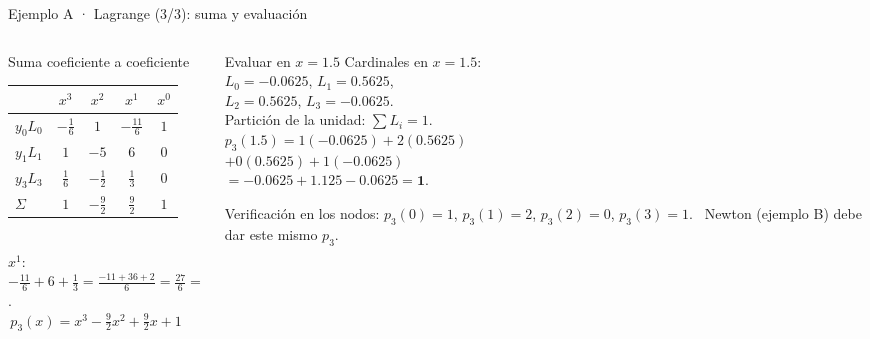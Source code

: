 \documentclass[aspectratio=169,10pt]{beamer}
\begin{document}
\begin{frame}{Ejemplo A · Lagrange (3/3): suma y evaluación}
\begin{columns}[T]
\begin{column}{0.52\textwidth}
\begin{cardgear}{Suma coeficiente a coeficiente}{\faTable}
\centering
{\footnotesize\renewcommand{\arraystretch}{1.2}\setlength{\tabcolsep}{6pt}
\begin{tabular}{l|cccc}
 & $x^3$ & $x^2$ & $x^1$ & $x^0$\\\hline
$y_0L_0$ & $-\tfrac16$ & $1$ & $-\tfrac{11}{6}$ & $1$\\
$y_1L_1$ & $1$ & $-5$ & $6$ & $0$\\
$y_3L_3$ & $\tfrac16$ & $-\tfrac12$ & $\tfrac13$ & $0$\\\hline
$\Sigma$ & $1$ & $-\tfrac92$ & $\tfrac92$ & $1$\\
\end{tabular}}\\[1.2mm]
{\footnotesize $x^1$: $-\tfrac{11}{6}+6+\tfrac13=\tfrac{-11+36+2}{6}=\tfrac{27}{6}=\tfrac92$.\\[0.6mm]
$\boxed{\,p_3(x)=x^3-\tfrac92x^2+\tfrac92x+1\,}$}
\end{cardgear}
\end{column}
\begin{column}{0.46\textwidth}
\begin{cardidea}{Evaluar en $x=1.5$}{\faCalculator}
{\footnotesize Cardinales en $x=1.5$:\\[0.4mm]
$L_0=-0.0625$, \; $L_1=0.5625$,\\[0.2mm]
$L_2=0.5625$, \; $L_3=-0.0625$.\\[0.6mm]
Partición de la unidad: $\sum L_i=1$. \checkmark\\[1.0mm]
$p_3(1.5)=1(-0.0625)+2(0.5625)$\\[0.2mm]
\hspace{14mm}$+0(0.5625)+1(-0.0625)$\\[0.2mm]
\hspace{9mm}$=-0.0625+1.125-0.0625=\mathbf{1}$.}
\end{cardidea}
\vspace{1mm}
\begin{cardnota}[\faInfoCircle]
{\footnotesize Verificación en los nodos: $p_3(0){=}1$, $p_3(1){=}2$, $p_3(2){=}0$, $p_3(3){=}1$. \checkmark\ Newton (ejemplo B) debe dar este mismo $p_3$.}
\end{cardnota}
\end{column}
\end{columns}
\end{frame}
\end{document}
